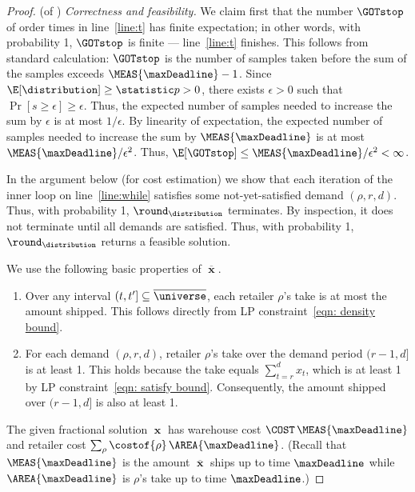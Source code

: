 \begin{proof}(of )
  {\em Correctness and feasibility.}
  We claim first that the number $\GOTstop$ of order times 
  in line~\ref{line:t} has finite expectation; in other words,
  	with probability 1, $\GOTstop$ is finite --- line~\ref{line:t} finishes.
This follows from standard calculation:
    $\GOTstop$
    is the number of samples taken before the sum of
    the samples exceeds $\MEAS{\maxDeadline}-1$.
    Since $\E[\distribution] \ge \statistic p > 0$,
    there exists $\epsilon>0$ such that $\Pr[s \ge \epsilon] \ge \epsilon$.
    Thus, the expected number of samples needed 
    to increase the sum by $\epsilon$ is at most $1/\epsilon$.
    By linearity of expectation,
    the expected number of samples needed to increase 
    the sum by $\MEAS{\maxDeadline}$ is at most
    $\MEAS{\maxDeadline}/\epsilon^2$.
    Thus, $\E[\GOTstop] \le \MEAS{\maxDeadline}/\epsilon^2<\infty$.

  In the argument below (for cost estimation)
	we show  that each iteration of the inner loop on line~\ref{line:while}
  satisfies some not-yet-satisfied demand $(\rho,r,d)$.
  Thus, with probability 1, $\round_\distribution$ terminates.
  By inspection, it does not terminate until all demands are satisfied.
  Thus, with probability 1, $\round_\distribution$ 
  returns a feasible solution.



We use the following basic properties of $\overline\mbfx$.
\begin{enumerate}
\item Over any interval $(t,t'] \subseteq \overline\universe$,
    each retailer $\rho$'s take is at most the amount shipped.
    This follows directly from LP constraint~\eqref{eqn: density bound}.
\item For each demand $(\rho, r, d)$,
    retailer $\rho$'s take over the demand period $(r-1,d]$ is at least 1.
	This holds because the take equals $\sum_{t=r}^d x_t$, 
    which is at least 1 by LP constraint~\eqref{eqn:  satisfy bound}.
    Consequently, the amount shipped over $(r-1,d]$ is also at least 1.
\end{enumerate}

  The given fractional solution $\mbfx$ 
  has warehouse cost $\COST\, \MEAS{\maxDeadline}$
  and retailer cost $\sum_{\rho} \costof{\rho}\, \AREA{\maxDeadline}$.
  (Recall that $\MEAS{\maxDeadline}$ is the amount $\overline\mbfx$ ships up to time $\maxDeadline$ 
  while $\AREA{\maxDeadline}$ is $\rho$'s take up to time $\maxDeadline$.)


\end{proof}
